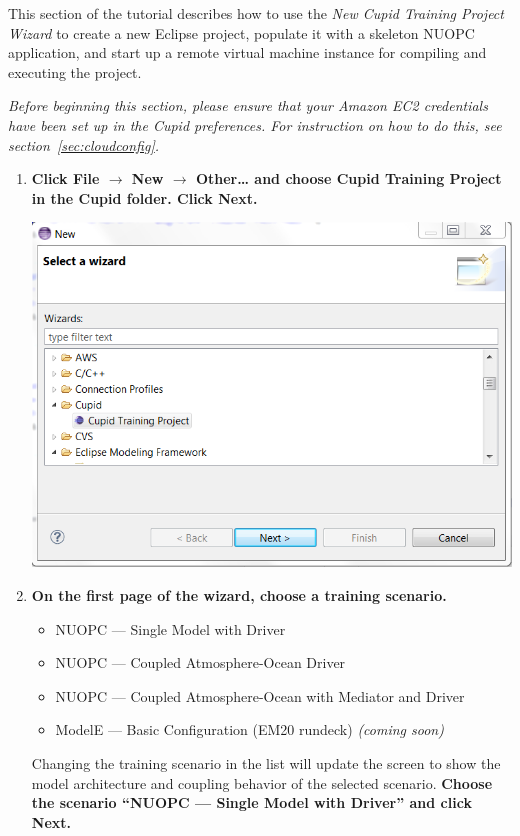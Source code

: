 \documentclass[oneside,11pt]{memoir}
\begin{document}
This section of the tutorial describes how to use the \emph{New Cupid Training Project Wizard} to create a new Eclipse project, populate it with a skeleton NUOPC application, and start up a remote virtual machine instance for compiling and executing the project.

\emph{Before beginning this section, please ensure that your Amazon EC2 credentials have been set up in the Cupid preferences. For instruction on how to do this, see section~\ref{sec:cloudconfig}.}

\begin{enumerate}

\item \textbf{Click File $\rightarrow$ New $\rightarrow$ Other… and choose Cupid Training Project in the Cupid folder.  Click Next.}

\parbox{\linewidth}{\centering
  \includegraphics{figs/cloud_fig1.png}
}


\item \textbf{On the first page of the wizard, choose a training scenario.  }

\begin{itemize}
\item NUOPC --- Single Model with Driver
\item NUOPC --- Coupled Atmosphere-Ocean Driver
\item NUOPC --- Coupled Atmosphere-Ocean with Mediator and Driver
\item ModelE --- Basic Configuration (EM20 rundeck) \emph{(coming soon)}
\end{itemize}

Changing the training scenario in the list will update the screen to show the model architecture and coupling behavior of the selected scenario.  \textbf{Choose the scenario ``NUOPC --- Single Model with Driver'' and click Next.}


\end{enumerate}
\end{document}
